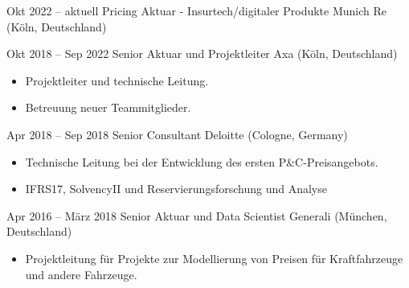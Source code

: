 \documentclass[a4paper,]{fortysecondscv}
\begin{document}
\begin{cvtable}%

    \vspace{\topsep}
    \cvitem
    {Okt 2022 -- aktuell}
    {Pricing Aktuar - Insurtech/digitaler Produkte}
    {Munich Re (Köln, Deutschland)}
    {
        \vspace{-\topsep}
    }

    \vspace{\topsep}
    \cvitem
    {Okt 2018 -- Sep 2022}
    {Senior Aktuar und Projektleiter}
    {Axa (Köln, Deutschland)}
    {
        \vspace{-\topsep}
        \begin{itemize}[nosep, leftmargin=0pt] %
            \item Projektleiter und technische Leitung.
            \item Betreuung neuer Teammitglieder.
        \end{itemize}
    }
    \vspace{\topsep}
    \cvitem
    {Apr 2018 -- Sep 2018}
    {Senior Consultant}
    {Deloitte (Cologne, Germany)}
    {
        \vspace{-\topsep}
        \begin{itemize}[nosep, leftmargin=0pt] %
            \item Technische Leitung bei der Entwicklung des ersten P\&C-Preisangebots.
            \item IFRS17, SolvencyII und Reservierungsforschung und Analyse
        \end{itemize}
    }
    \vspace{\topsep}
    \cvitem
    {Apr 2016 -- März 2018}
    {Senior Aktuar und Data Scientist}
    {Generali (München, Deutschland)}
    {
        \vspace{-\topsep}
        \begin{itemize}[nosep, leftmargin=0pt] %
            \item Projektleitung für Projekte zur Modellierung von Preisen für Kraftfahrzeuge und andere Fahrzeuge.

\end{itemize}}
\end{cvtable}
\end{document}
